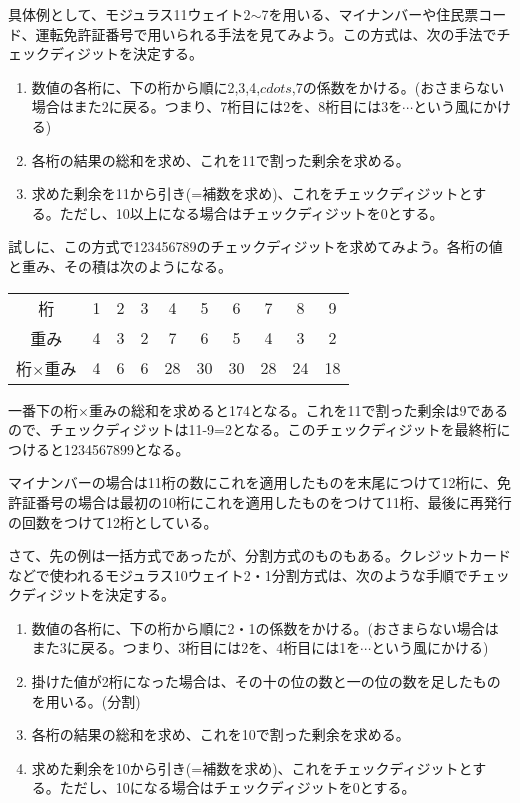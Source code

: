 具体例として、モジュラス11ウェイト2$\sim$7を用いる、マイナンバーや住民票コード、運転免許証番号で用いられる手法を見てみよう。この方式は、次の手法でチェックディジットを決定する。
\begin{enumerate}
\item 数値の各桁に、下の桁から順に2,3,4,$cdots$,7の係数をかける。(おさまらない場合はまた$2$に戻る。つまり、7桁目には2を、8桁目には3を$\cdots$という風にかける)
\item 各桁の結果の総和を求め、これを11で割った剰余を求める。
\item 求めた剰余を11から引き(=補数を求め)、これをチェックディジットとする。ただし、10以上になる場合はチェックディジットを0とする。
\end{enumerate}

試しに、この方式で123456789のチェックディジットを求めてみよう。各桁の値と重み、その積は次のようになる。
\begin{center}
\begin{tabular}{c|ccccccccc}
桁&1&2&3&4&5&6&7&8&9 \\ 
重み&4&3&2&7&6&5&4&3&2 \\ \hline
桁$\times$重み&4&6&6&28&30&30&28&24&18 \\ 
\end{tabular}
\end{center}
一番下の桁$\times$重みの総和を求めると174となる。これを11で割った剰余は9であるので、チェックディジットは11-9=2となる。このチェックディジットを最終桁につけると1234567899となる。

マイナンバーの場合は11桁の数にこれを適用したものを末尾につけて12桁に、免許証番号の場合は最初の10桁にこれを適用したものをつけて11桁、最後に再発行の回数をつけて12桁としている。


さて、先の例は一括方式であったが、分割方式のものもある。クレジットカードなどで使われるモジュラス10ウェイト2・1分割方式は、次のような手順でチェックディジットを決定する。
\begin{enumerate}
\item 数値の各桁に、下の桁から順に2・1の係数をかける。(おさまらない場合はまた3に戻る。つまり、3桁目には2を、4桁目には1を$\cdots$という風にかける)
\item 掛けた値が2桁になった場合は、その十の位の数と一の位の数を足したものを用いる。(分割)
\item 各桁の結果の総和を求め、これを10で割った剰余を求める。
\item 求めた剰余を10から引き(=補数を求め)、これをチェックディジットとする。ただし、10になる場合はチェックディジットを0とする。
\end{enumerate}

